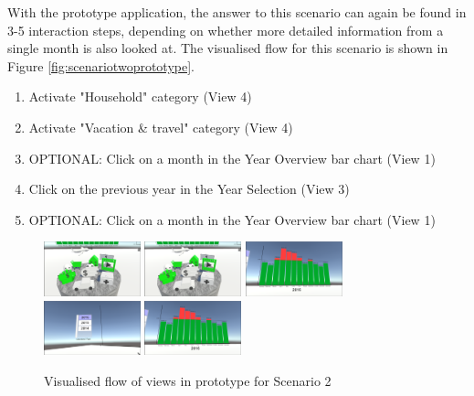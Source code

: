 With the prototype application, the answer to this scenario can again be found in 3-5 interaction steps, depending on whether more detailed information from a single month is also looked at. The visualised flow for this scenario is shown in Figure \ref{fig:scenariotwoprototype}.
\begin{enumerate}
	\item Activate "Household" category (View 4)
	\item Activate "Vacation \& travel" category (View 4)
	\item OPTIONAL: Click on a month in the Year Overview bar chart (View 1)
	\item Click on the previous year in the Year Selection (View 3)
	\item OPTIONAL: Click on a month in the Year Overview bar chart (View 1)
\end{enumerate}
\begin{figure}[h]
	\begin{center}
		\includegraphics[width=2.8cm]{03_Figures/08_Development/View4_CategoriesFiltering.png}
		\includegraphics[width=2.8cm]{03_Figures/08_Development/View4_CategoriesFiltering.png}
		\includegraphics[width=2.8cm]{03_Figures/08_Development/View1_YearOverview.png}
		\includegraphics[width=2.8cm]{03_Figures/08_Development/View3_YearSelection.png}
		\includegraphics[width=2.8cm]{03_Figures/08_Development/View1_YearOverview.png}
		\caption{Visualised flow of views in prototype for Scenario 2}
		\label{fig:scenariotwoeprototype}
	\end{center}
\end{figure}

